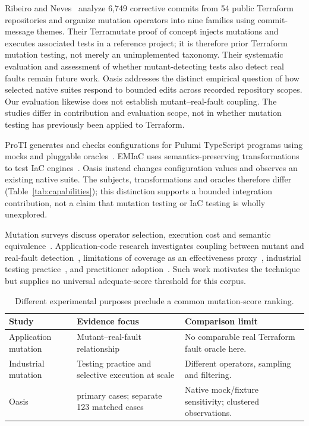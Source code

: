 Ribeiro and Neves~\cite{ribeiro} analyze 6,749 corrective commits from 54 public Terraform repositories and organize mutation operators into nine families using commit-message themes. Their Terramutate proof of concept injects mutations and executes associated tests in a reference project; it is therefore prior Terraform mutation testing, not merely an unimplemented taxonomy. Their systematic evaluation and assessment of whether mutant-detecting tests also detect real faults remain future work. Oasis addresses the distinct empirical question of how selected native suites respond to bounded edits across recorded repository scopes. Our evaluation likewise does not establish mutant--real-fault coupling. The studies differ in contribution and evaluation scope, not in whether mutation testing has previously been applied to Terraform.



ProTI generates and checks configurations for Pulumi TypeScript programs using mocks and pluggable oracles~\cite{proti}. EMIaC uses semantics-preserving transformations to test IaC engines~\cite{emiac}. Oasis instead changes configuration values and observes an existing native suite. The subjects, transformations and oracles therefore differ (Table~\ref{tab:capabilities}); this distinction supports a bounded integration contribution, not a claim that mutation testing or IaC testing is wholly unexplored.

Mutation surveys discuss operator selection, execution cost and semantic equivalence~\cite{jia,papadakis,madeyski}. Application-code research investigates coupling between mutant and real-fault detection~\cite{just}, limitations of coverage as an effectiveness proxy~\cite{coverage}, industrial testing practice~\cite{practices,scale}, and practitioner adoption~\cite{sanchez}. Such work motivates the technique but supplies no universal adequate-score threshold for this corpus.

\begin{table}[ht]
\caption{Different experimental purposes preclude a common mutation-score ranking.}\label{tab:application}
\small\begin{tabularx}{\linewidth}{@{}p{3.1 cm}X X@{}}\toprule
Study & Evidence focus & Comparison limit\\\midrule
Application mutation~\cite{just} & Mutant--real-fault relationship & No comparable real Terraform fault oracle here.\\
Industrial mutation~\cite{practices,scale} & Testing practice and selective execution at scale & Different operators, sampling and filtering.\\
Oasis & \NScored{} primary cases; separate 123 matched cases & Native mock/fixture sensitivity; clustered observations.\\\bottomrule
\end{tabularx}\end{table}

